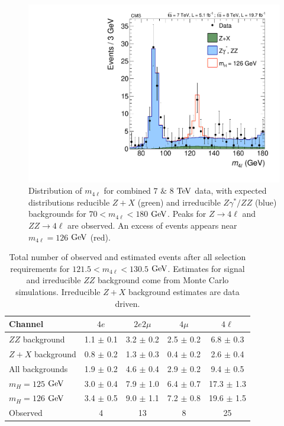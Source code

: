 \begin{figure}[htbp]
\begin{center}
\includegraphics[width=.7\linewidth]{HiggsDiscovery/figures/ZZMass_7Plus8TeV_70-180_3GeV.pdf}
\caption[$m_{4\ell}$ Distributions of $4\ell$ Events, $m_{4\ell}<180$ $\rm{GeV}$]{Distribution of $m_{4\ell}$ for combined $7$  $\&$ $8$ $\rm{TeV}$ data, with expected distributions reducible $Z+X$ (green) and irreducible $Z\gamma^{*}/ZZ$ (blue) backgrounds for $70< m_{4\ell} < 180$ $\rm{GeV}$. Peaks for $Z\rightarrow 4\ell$ and $ZZ\rightarrow 4\ell$ are observed. An excess of events appears near $m_{4\ell} = 126$ $\rm{GeV}$ (red).}
\label{fig:m4lPlotZoom}
\end{center}
\end{figure}

\begin{table}[htbp]
\begin{center}
\begin{tabular}{l|c|c|c|c}
\hline \hline
      Channel        & $4e$ & $2e2\mu$ & $4\mu$  & $4\ell$ \\
      \hline
      $ZZ$ background &  1.1  $\pm$  0.1  &  3.2  $\pm$  0.2  &  2.5  $\pm$  0.2  &  6.8 $\pm$ 0.3  \\
      $Z + X$ background &  0.8  $\pm$  0.2  &  1.3  $\pm$  0.3  &  0.4  $\pm$  0.2  &  2.6 $\pm$ 0.4 \\
      \hline
      All backgrounds            &  1.9  $\pm$  0.2   &  4.6  $\pm$ 0.4  & 2.9  $\pm$ 0.2  & 9.4  $\pm$ 0.5\\
      \hline
      $m_H =  125$ $\rm{GeV}$ &  3.0  $\pm$  0.4  &  7.9  $\pm$  1.0  &  6.4  $\pm$  0.7  & 17.3  $\pm$ 1.3 \\
      $m_H =  126$ $\rm{GeV}$ &  3.4  $\pm$  0.5  &  9.0  $\pm$  1.1  &  7.2  $\pm$  0.8  & 19.6  $\pm$ 1.5 \\
      \hline
      Observed  & 4 & 13 & 8 & 25 \\
\hline \hline
\end{tabular}
\caption[Number of Observed $4\ell$ Events in $121.5 < m_{4\ell} < 130.5$ $\rm{GeV}$]{Total number of observed and estimated events after all selection requirements for $121.5 < m_{4\ell} < 130.5$ $\rm{GeV}$. Estimates for signal and irreducible $ZZ$ background come from Monte Carlo simulations. Irreducible $Z+X$ background estimates are data driven.
\label{tbl:ZZ4lEventsNarrowRange}}
\end{center}
\end{table}

